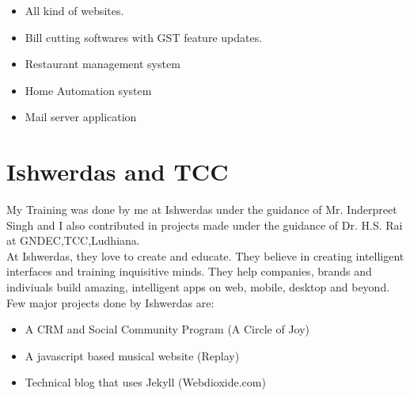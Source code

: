\begin{itemize}
	\item All kind of websites.
	\item Bill cutting softwares with GST feature updates.
	\item Restaurant management system
	\item Home Automation system
	\item Mail server application
	\end{itemize}
\section{Ishwerdas and TCC}

My Training was done by me at Ishwerdas under the guidance of Mr. Inderpreet Singh and I also contributed in projects
made under the guidance of Dr. H.S. Rai at GNDEC,TCC,Ludhiana. \\
At Ishwerdas, they love to create and educate. They believe in creating intelligent interfaces and training inquisitive minds. They help companies, brands and indiviuals build amazing, intelligent apps on web, mobile, desktop and beyond.\\
Few major projects done by Ishwerdas are:
\begin{itemize}
	\item A CRM and Social Community Program (A Circle of Joy)
	\item A javascript based musical website (Replay)
	\item Technical blog that uses Jekyll (Webdioxide.com)

\end{itemize}
 

